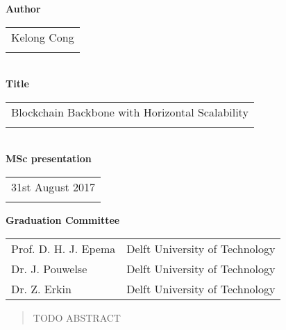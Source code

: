 \thispagestyle{empty}

\noindent \textbf{Author}\\
\begin{tabular}{l}
Kelong Cong\\
\\
\end{tabular}\\
\noindent \textbf{Title}\\
\begin{tabular}{l}
Blockchain Backbone with Horizontal Scalability\\
\\
\end{tabular}\\
\noindent \textbf{MSc presentation}\\
\begin{tabular}{l}
31st August 2017\\
\\
\end{tabular}

\vspace{1.1cm}

\noindent \textbf{Graduation Committee}\\
\begin{tabular}{ll}
Prof. D. H. J. Epema           & Delft University of Technology \\
Dr. J. Pouwelse                & Delft University of Technology \\
Dr. Z. Erkin                   & Delft University of Technology \\
\end{tabular}

\begin{abstract} %
TODO ABSTRACT
\end{abstract}

\clearpage

